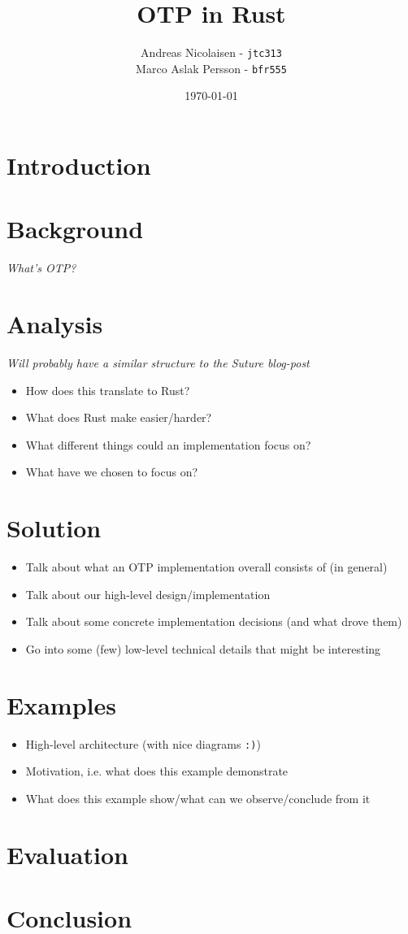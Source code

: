 \documentclass[a4paper]{article}
\title{OTP in Rust}
\author{Andreas Nicolaisen - \texttt{jtc313} \\ Marco Aslak Persson - \texttt{bfr555}}
\date{\today}
\begin{document}
\maketitle

\section{Introduction}

\section{Background}
\textit{What's OTP?}

\section{Analysis}
\textit{Will probably have a similar structure to the Suture blog-post}
\begin{itemize}
\item How does this translate to Rust?
\item What does Rust make easier/harder?
\item What different things could an implementation focus on?
\item What have we chosen to focus on?
\end{itemize}

\section{Solution}
\begin{itemize}
\item Talk about what an OTP implementation overall consists of (in general)
\item Talk about our high-level design/implementation
\item Talk about some concrete implementation decisions (and what drove them)
\item Go into some (few) low-level technical details that might be interesting
\end{itemize}

\section{Examples}
\begin{itemize}
\item High-level architecture (with nice diagrams \texttt{:)})
\item Motivation, i.e. what does this example demonstrate
\item What does this example show/what can we observe/conclude from it
\end{itemize}

\section{Evaluation}


\section{Conclusion}
\end{document}
